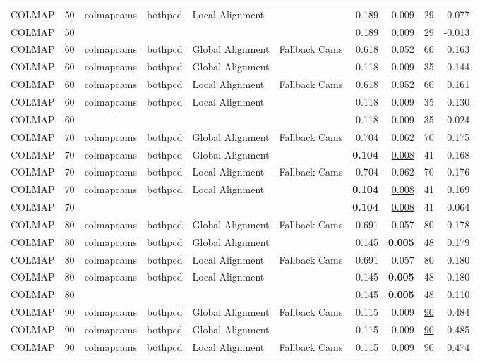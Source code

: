 \begin{table}[H]
\begin{tabular}{lrllllrrrr}
COLMAP & 50 & colmapcams & bothpcd & Local Alignment &  & 0.189 & 0.009 & 29 & 0.077 \\
COLMAP & 50 &  &  &  &  & 0.189 & 0.009 & 29 & -0.013 \\
COLMAP & 60 & colmapcams & bothpcd & Global Alignment & Fallback Cams & 0.618 & 0.052 & 60 & 0.163 \\
COLMAP & 60 & colmapcams & bothpcd & Global Alignment &  & 0.118 & 0.009 & 35 & 0.144 \\
COLMAP & 60 & colmapcams & bothpcd & Local Alignment & Fallback Cams & 0.618 & 0.052 & 60 & 0.161 \\
COLMAP & 60 & colmapcams & bothpcd & Local Alignment &  & 0.118 & 0.009 & 35 & 0.130 \\
COLMAP & 60 &  &  &  &  & 0.118 & 0.009 & 35 & 0.024 \\
COLMAP & 70 & colmapcams & bothpcd & Global Alignment & Fallback Cams & 0.704 & 0.062 & 70 & 0.175 \\
COLMAP & 70 & colmapcams & bothpcd & Global Alignment &  & \textbf{0.104} & \underline{0.008} & 41 & 0.168 \\
COLMAP & 70 & colmapcams & bothpcd & Local Alignment & Fallback Cams & 0.704 & 0.062 & 70 & 0.176 \\
COLMAP & 70 & colmapcams & bothpcd & Local Alignment &  & \textbf{0.104} & \underline{0.008} & 41 & 0.169 \\
COLMAP & 70 &  &  &  &  & \textbf{0.104} & \underline{0.008} & 41 & 0.064 \\
COLMAP & 80 & colmapcams & bothpcd & Global Alignment & Fallback Cams & 0.691 & 0.057 & 80 & 0.178 \\
COLMAP & 80 & colmapcams & bothpcd & Global Alignment &  & 0.145 & \textbf{0.005} & 48 & 0.179 \\
COLMAP & 80 & colmapcams & bothpcd & Local Alignment & Fallback Cams & 0.691 & 0.057 & 80 & 0.180 \\
COLMAP & 80 & colmapcams & bothpcd & Local Alignment &  & 0.145 & \textbf{0.005} & 48 & 0.180 \\
COLMAP & 80 &  &  &  &  & 0.145 & \textbf{0.005} & 48 & 0.110 \\
COLMAP & 90 & colmapcams & bothpcd & Global Alignment & Fallback Cams & 0.115 & 0.009 & \underline{90} & 0.484 \\
COLMAP & 90 & colmapcams & bothpcd & Global Alignment &  & 0.115 & 0.009 & \underline{90} & 0.485 \\
COLMAP & 90 & colmapcams & bothpcd & Local Alignment & Fallback Cams & 0.115 & 0.009 & \underline{90} & 0.474 \\

\end{tabular}
\end{table}
